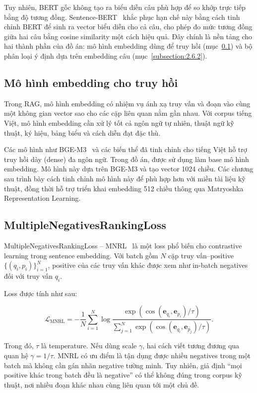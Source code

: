 \documentclass[../DoAn.tex]{subfiles}
\begin{document}
Tuy nhiên, BERT gốc không tạo ra biểu diễn câu phù hợp để so khớp trực tiếp bằng độ tương đồng. Sentence-BERT~\cite{reimers2019sbert} khắc phục hạn chế này bằng cách tinh chỉnh BERT để sinh ra vector biểu diễn cho cả câu, cho phép đo mức tương đồng giữa hai câu bằng cosine similarity một cách hiệu quả. Đây chính là nền tảng cho hai thành phần của đồ án: mô hình embedding dùng để truy hồi (mục~\ref{subsection:2.4.2}) và bộ phân loại ý định dựa trên embedding câu (mục~\ref{subsection:2.6.2}).

\subsection{Mô hình embedding cho truy hồi}
\label{subsection:2.4.2}

Trong RAG, mô hình embedding có nhiệm vụ ánh xạ truy vấn và đoạn vào cùng một không gian vector sao cho các cặp liên quan nằm gần nhau. Với corpus tiếng Việt, mô hình embedding cần xử lý tốt cả ngôn ngữ tự nhiên, thuật ngữ kỹ thuật, ký hiệu, bảng biểu và cách diễn đạt đặc thù.

Các mô hình như BGE-M3~\cite{chen2024bgem3} và các biến thể đã tinh chỉnh cho tiếng Việt hỗ trợ truy hồi dày (dense) đa ngôn ngữ. Trong đồ án,  được sử dụng làm base mô hình embedding. Mô hình này dựa trên BGE-M3 và tạo vector 1024 chiều. Các chương sau trình bày cách tinh chỉnh mô hình này để phù hợp hơn với miền tài liệu kỹ thuật, đồng thời hỗ trợ triển khai embedding 512 chiều thông qua Matryoshka Representation Learning.

\subsection{MultipleNegativesRankingLoss}
\label{subsection:2.4.3}

MultipleNegativesRankingLoss -- MNRL~\cite{henderson2017mnr} là một loss phổ biến cho contrastive learning trong sentence embedding. Với batch gồm $N$ cặp truy vấn--positive $\{(q_i,p_i)\}_{i=1}^{N}$, positive của các truy vấn khác được xem như in-batch negatives đối với truy vấn $q_i$.

Loss được tính như sau:

\[
\mathcal{L}_{\mathrm{MNRL}}
=
-\frac{1}{N}
\sum_{i=1}^{N}
\log
\frac{
\exp
\left(
\cos(\mathbf{e}_{q_i},\mathbf{e}_{p_i})/\tau
\right)
}{
\sum_{j=1}^{N}
\exp
\left(
\cos(\mathbf{e}_{q_i},\mathbf{e}_{p_j})/\tau
\right)
}.
\]

Trong đó, $\tau$ là temperature. Nếu dùng scale $\gamma$, hai cách viết tương đương qua quan hệ $\gamma = 1/\tau$. MNRL có ưu điểm là tận dụng được nhiều negatives trong một batch mà không cần gán nhãn negative tường minh. Tuy nhiên, giả định ``mọi positive khác trong batch đều là negative'' có thể không đúng trong corpus kỹ thuật, nơi nhiều đoạn khác nhau cùng liên quan tới một chủ đề.
\end{document}
